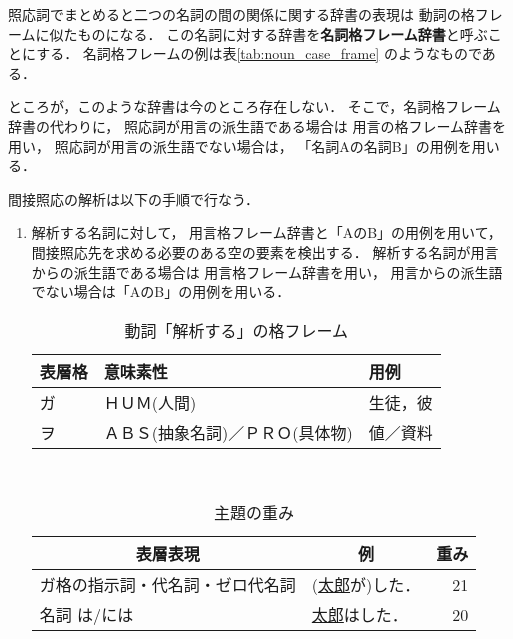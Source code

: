 照応詞でまとめると二つの名詞の間の関係に関する辞書の表現は
動詞の格フレームに似たものになる．
この名詞に対する辞書を{\bf 名詞格フレーム辞書}と呼ぶことにする．
名詞格フレームの例は表\ref{tab:noun_case_frame} のようなものである．

ところが，このような辞書は今のところ存在しない．
そこで，名詞格フレーム辞書の代わりに，
照応詞が用言の派生語である場合は
用言の格フレーム辞書を用い，
照応詞が用言の派生語でない場合は，
「名詞Aの名詞B」の用例を用いる．

間接照応の解析は以下の手順で行なう．
\begin{enumerate}
\item 
\label{enum:youso_kenshutu}
解析する名詞に対して，
用言格フレーム辞書と「AのB」の用例を用いて，
間接照応先を求める必要のある空の要素を検出する．
解析する名詞が用言からの派生語である場合は
用言格フレーム辞書を用い，
用言からの派生語でない場合は「AのB」の用例を用いる．

\begin{table}[t]
  \caption{動詞「解析する」の格フレーム}
  \label{tab:kuitigau_frame}
  \begin{center}
\begin{tabular}[h]{|l|l|l|}\hline
表層格   & 意味素性 &  用例\\\hline
ガ       & ＨＵＭ(人間)       & 生徒，彼\\
ヲ       & ＡＢＳ(抽象名詞)／ＰＲＯ(具体物)     & 値／資料\\\hline
\end{tabular}\\
  \end{center}
\end{table}

\begin{table}[t]
  \caption{主題の重み}
  \label{fig:shudai_omomi}
\begin{center}
    \newcommand{\mn}[1]{}
\begin{tabular}[c]{|l|l|r|}\hline
  \multicolumn{1}{|c|}{表層表現} & \multicolumn{1}{|c|}{例} & 重み
  \\\hline
  ガ格の指示詞・代名詞・ゼロ代名詞 &
  (\underline{太郎}が)した．&21 \\\hline
名詞 は/には        &  \underline{太郎}はした．  &20 \\\hline
\end{tabular}
\end{center}
\end{table}


\end{enumerate}
